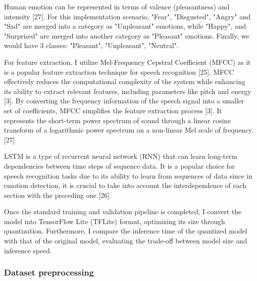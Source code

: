 Human emotion can be represented in terms of valence (pleasantness) and intensity [27]. For this implementation scenario, "Fear", "Disgusted", "Angry" and "Sad" are merged into a category as "Unpleasant" emotions, while "Happy", and "Surprised" are merged into another category as "Pleasant" emotions.
Finally, we would have 3 classes: "Pleasant", "Unpleasant", "Neutral".

For feature extraction, I utilize Mel-Frequency Cepstral Coefficient (MFCC) as it is a popular feature extraction technique for speech recognition [25]. MFCC effectively reduces the computational complexity of the system while enhancing its ability to extract relevant features, including parameters like pitch and energy [3]. By converting the frequency information of the speech signal into a smaller set of coefficients, 
MFCC simplifies the feature extraction process [3]. It represents the short-term power spectrum of sound through a linear cosine transform of a logarithmic power spectrum on a non-linear Mel scale of frequency. [27]

LSTM is a type of recurrent neural network (RNN) that can learn long-term dependencies between time steps of sequence data. It is a popular choice for speech recognition tasks due to its ability to learn from sequences of data since in emotion detection,  it is crucial to take into account the interdependence of each section with the preceding one [26].

Once the standard training and validation pipeline is completed, I convert the model into TensorFlow Lite (TFLite) format, optimizing its size through quantization. Furthermore, I compare the inference time of the quantized model with that of the original model, evaluating the trade-off between model size and inference speed.
\subsubsection{Dataset preprocessing}

